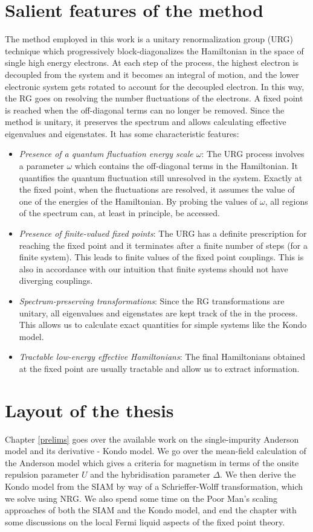 \section{Salient features of the method}
The method employed in this work is a unitary renormalization group (URG) technique which progressively block-diagonalizes the Hamiltonian in the space of single high energy electrons. At each step of the process, the highest electron is decoupled from the system and it becomes an integral of motion, and the lower electronic system gets rotated to account for the decoupled electron. In this way, the RG goes on resolving the number fluctuations of the electrons. A fixed point is reached when the off-diagonal terms can no longer be removed. Since the method is unitary, it preserves the spectrum and allows calculating effective eigenvalues and eigenstates. It has some characteristic features:
\begin{itemize}
    \item \textit{Presence of a quantum fluctuation energy scale \(\omega\)}: 
The URG process involves a parameter \(\omega\) which contains the off-diagonal terms in the Hamiltonian. It quantifies the quantum fluctuation still unresolved in the system. Exactly at the fixed point, when the fluctuations are resolved, it assumes the value of one of the energies of the Hamiltonian. By probing the values of \(\omega\), all regions of the spectrum can, at least in principle, be accessed.
    \item \textit{Presence of finite-valued fixed points}:
The URG has a definite prescription for reaching the fixed point and it terminates after a finite number of steps (for a finite system). This leads to finite values of the fixed point  couplings. This is also in accordance with our intuition that finite systems should not have diverging couplings.
    \item \textit{Spectrum-preserving transformations}:
Since the RG transformations are unitary, all eigenvalues and eigenstates are kept track of the in the process. This allows us to calculate exact quantities for simple systems like the Kondo model.
    \item \textit{Tractable low-energy effective Hamiltonians}:
The final Hamiltonians obtained at the fixed point are usually tractable and allow us to extract information.
\end{itemize}

\section{Layout of the thesis}
Chapter \ref{prelims} goes over the available work on the single-impurity Anderson model and its derivative - Kondo model. We go over the mean-field calculation of the Anderson model which gives a criteria for magnetism in terms of the onsite repulsion parameter \(U\) and the hybridisation parameter \(\Delta\). We then derive the Kondo model from the SIAM by way of a Schrieffer-Wolff transformation, which we solve using NRG. We also spend some time on the Poor Man's scaling approaches of both the SIAM and the Kondo model, and end the chapter with some discussions on the local Fermi liquid aspects of the fixed point theory.

